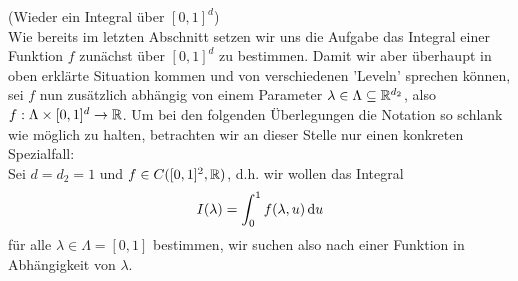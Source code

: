 \begin{Beispiel}(Wieder ein Integral über $[0,1]^d$)\\
	Wie bereits im letzten Abschnitt setzen wir uns die Aufgabe das Integral einer Funktion $ f $ zunächst über $ [0,1]^d $ zu bestimmen. Damit wir aber überhaupt in oben erklärte Situation kommen und von verschiedenen 'Leveln' sprechen können, sei $ f $ nun zusätzlich abhängig von einem Parameter $ \lambda \in \Lambda \subseteq \mathbb{R}^{d_2}$, also $f : \Lambda \times [0,1]^d \to \mathbb{R} $. Um bei den folgenden Überlegungen die Notation so schlank wie möglich zu halten, betrachten wir an dieser Stelle nur einen konkreten Spezialfall: \\
	Sei $ d = d_2 = 1 $ und $ f \in C([0,1]^2,\mathbb{R}) $, d.h. wir wollen das Integral 
	\[
		I(\lambda) = \int_{0}^{1} f(\lambda,u) \, \mathrm{d} u
	\]
	für alle $ \lambda \in \Lambda = [0,1] $ bestimmen, wir suchen also nach einer Funktion in Abhängigkeit von $ \lambda $.\\
	

\end{Beispiel}
